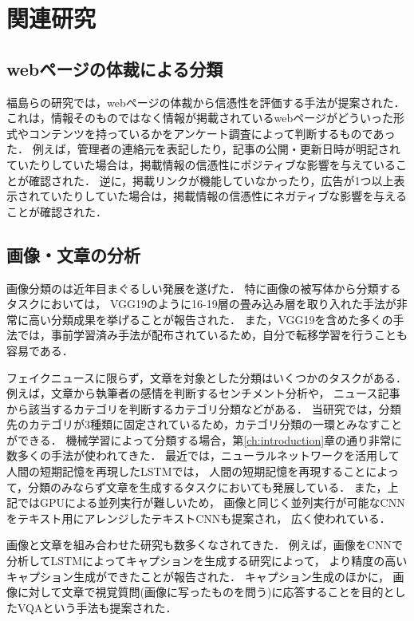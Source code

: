 \chapter{関連研究}\label{ch:related}
\section{webページの体裁による分類}
福島らの研究\cite{2007}では，webページの体裁から信憑性を評価する手法が提案された．
これは，情報そのものではなく情報が掲載されているwebページがどういった形式やコンテンツを持っているかをアンケート調査によって判断するものであった．
例えば，管理者の連絡元を表記したり，記事の公開・更新日時が明記されていたりしていた場合は，掲載情報の信憑性にポジティブな影響を与えていることが確認された．
逆に，掲載リンクが機能していなかったり，広告が1つ以上表示されていたりしていた場合は，掲載情報の信憑性にネガティブな影響を与えることが確認された．

\section{画像・文章の分析}
画像分類のは近年目まぐるしい発展を遂げた．
特に画像の被写体から分類するタスクにおいては，
VGG19のように16-19層の畳み込み層を取り入れた手法が非常に高い分類成果を挙げることが報告\cite{DBLP:journals/corr/SimonyanZ14a}された．
また，VGG19を含めた多くの手法では，事前学習済み手法が配布されているため，自分で転移学習を行うことも容易である．

フェイクニュースに限らず，文章を対象とした分類はいくつかのタスクがある．
例えば，文章から執筆者の感情を判断するセンチメント分析や，
ニュース記事から該当するカテゴリを判断するカテゴリ分類などがある．
当研究では，分類先のカテゴリが3種類に固定されているため，カテゴリ分類の一環とみなすことができる．
機械学習によって分類する場合，第\ref{ch:introduction}章の通り非常に数多くの手法が使われてきた．
最近では，ニューラルネットワークを活用して人間の短期記憶を再現したLSTM\cite{7508408}では，
人間の短期記憶を再現することによって，分類のみならず文章を生成するタスクにおいても発展している．
また，上記ではGPUによる並列実行が難しいため，
画像と同じく並列実行が可能なCNNをテキスト用にアレンジしたテキストCNNも提案\cite{DBLP:journals/corr/Kim14f}され，
広く使われている．

画像と文章を組み合わせた研究も数多くなされてきた．
例えば，画像をCNNで分析してLSTMによってキャプションを生成する研究\cite{7298935}によって，
より精度の高いキャプション生成ができたことが報告された．
キャプション生成のほかに，
画像に対して文章で視覚質問(画像に写ったものを問う)に応答することを目的としたVQA\cite{7410636}という手法も提案された．

